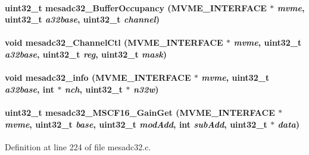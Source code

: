 \paragraph[{mesadc32\_\-BufferOccupancy}]{\setlength{\rightskip}{0pt plus 5cm}uint32\_\-t mesadc32\_\-BufferOccupancy ({\bf MVME\_\-INTERFACE} $\ast$ {\em mvme}, \/  uint32\_\-t {\em a32base}, \/  uint32\_\-t {\em channel})}\hfill\label{mesadc32drv_8h_a7c5b39c3f20a59b406eb1c41a050e9f8}
\paragraph[{mesadc32\_\-ChannelCtl}]{\setlength{\rightskip}{0pt plus 5cm}void mesadc32\_\-ChannelCtl ({\bf MVME\_\-INTERFACE} $\ast$ {\em mvme}, \/  uint32\_\-t {\em a32base}, \/  uint32\_\-t {\em reg}, \/  uint32\_\-t {\em mask})}\hfill\label{mesadc32drv_8h_a425efe4808e4f2cf67f646ea881c27b9}
\paragraph[{mesadc32\_\-info}]{\setlength{\rightskip}{0pt plus 5cm}void mesadc32\_\-info ({\bf MVME\_\-INTERFACE} $\ast$ {\em mvme}, \/  uint32\_\-t {\em a32base}, \/  int $\ast$ {\em nch}, \/  uint32\_\-t $\ast$ {\em n32w})}\hfill\label{mesadc32drv_8h_a06978ab1e9e1b303da8c30ba3b662579}
\paragraph[{mesadc32\_\-MSCF16\_\-GainGet}]{\setlength{\rightskip}{0pt plus 5cm}uint32\_\-t mesadc32\_\-MSCF16\_\-GainGet ({\bf MVME\_\-INTERFACE} $\ast$ {\em mvme}, \/  uint32\_\-t {\em base}, \/  uint32\_\-t {\em modAdd}, \/  int {\em subAdd}, \/  uint32\_\-t $\ast$ {\em data})}\hfill\label{mesadc32drv_8h_ab6ec3e84f7070736d8e848ef51b5cd0d}


Definition at line 224 of file mesadc32.c.
